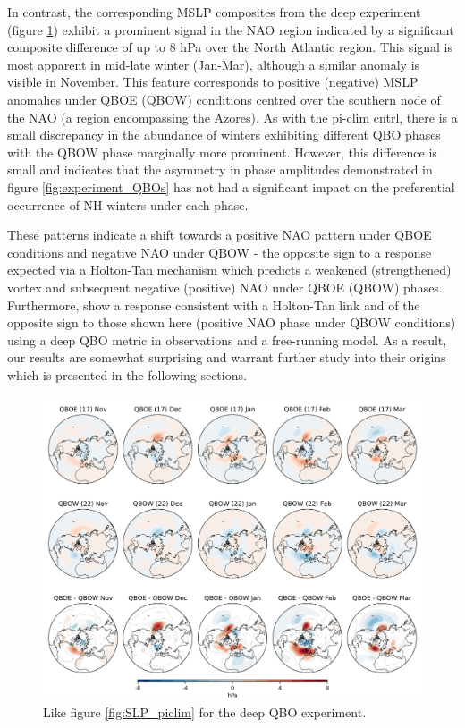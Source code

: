In contrast, the corresponding MSLP composites from the deep experiment (figure \ref{fig:SLP_deep}) exhibit a prominent signal in the NAO region indicated by a significant composite difference of up to 8 hPa over the North Atlantic region. This signal is most apparent in mid-late winter (Jan-Mar), although a similar anomaly is visible in November. This feature corresponds to positive (negative) MSLP anomalies under QBOE (QBOW) conditions centred over the southern node of the NAO (a region encompassing the Azores). As with the pi-clim cntrl, there is a small discrepancy in the abundance of winters exhibiting different QBO phases with the QBOW phase marginally more prominent. However, this difference is small and indicates that the asymmetry in phase amplitudes demonstrated in figure \ref{fig:experiment_QBOs} has not had a significant impact on the preferential occurrence of NH winters under each phase.

These patterns indicate a shift towards a positive NAO pattern under QBOE conditions and negative NAO under QBOW - the opposite sign to a response expected via a Holton-Tan mechanism which predicts a weakened (strengthened) vortex and subsequent negative (positive) NAO under QBOE (QBOW) phases. Furthermore, \cite{andrewsObserved2019d} show a response consistent with a Holton-Tan link and of the opposite sign to those shown here (positive NAO phase under QBOW conditions) using a deep QBO metric in observations and a free-running model. As a result, our results are somewhat surprising and warrant further study into their origins which is presented in the following sections.
\begin{figure}[h!]
\begin{center}
\noindent\includegraphics[width =0.8\linewidth]{Figures/Figures-deepQBO/LAGGED_SLP_composites_individual_months_QBO_phases_U_d_higher_50hPa_5thresh.png}
\caption[MSLP composites under different QBO phases in the deep QBO simulation]{Like figure \ref{fig:SLP_piclim} for the deep QBO experiment.}
\label{fig:SLP_deep}
\end{center}
\end{figure}

